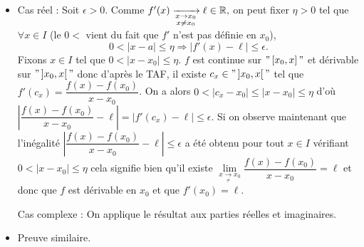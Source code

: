 \documentclass{magnoliaold}
\begin{document}
\begin{preuve}
  \begin{itemize}
  \item Cas réel : Soit $\epsilon>0$. Comme $f'(x)\xrightarrow[ \substack{x\rightarrow x_0 \\ x\not=x_0}]{} \ell\in\mathbb{R},$ on peut fixer $\eta>0$ tel que $\forall x \in I$ (le $0<$ vient du fait que $f'$ n'est pas définie en $x_0$), $$0<|x-a|\leq \eta \Longrightarrow |f'(x)-\ell|\leq \epsilon.$$
  Fixons $x\in I$ tel que $0<|x-x_0|\leq \eta$. $f$ est continue sur $"\left[x_0,x\right]"$ et dérivable sur $"\left]x_0,x\right["$ donc d'après le TAF, il existe $c_x\in "\left]x_0,x\right["$ tel que $f'(c_x)=\dfrac{f(x)-f(x_0)}{x-x_0}$. On a alors $0<|c_x-x_0|\leq |x-x_0|\leq\eta$ d'où $|\dfrac{f(x)-f(x_0)}{x-x_0}-\ell|=|f'(c_x)-\ell|\leq \epsilon$. Si on observe maintenant que l'inégalité $|\dfrac{f(x)-f(x_0)}{x-x_0}-\ell|\leq \epsilon$ a été obtenu pour tout $x\in I$ vérifiant $0<|x-x_0|\leq \eta$ cela signifie bien qu'il existe $\underset{x\underset{\neq}{\to}x_0}{\lim}\dfrac{f(x)-f(x_0)}{x-x_0}=\ell$ et donc que $f$ est dérivable en $x_0$ et que $f'(x_0)=\ell$.
  
  Cas complexe : On applique le résultat aux parties réelles et imaginaires.
    
  \item Preuve similaire.
  \end{itemize}
  
  \end{preuve}
\end{document}
